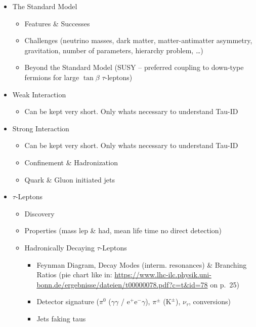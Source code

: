 \begin{itemize}

\item The Standard Model
  \begin{itemize}
  \item Features \& Successes

  \item Challenges (neutrino masses, dark matter, matter-antimatter asymmetry,
    gravitation, number of parameters, hierarchy problem, \ldots)

  \item Beyond the Standard Model (SUSY -- preferred coupling to down-type
    fermions for large $\tan\beta$ \textrightarrow $\tau$-leptons)
  \end{itemize}

\item Weak Interaction
\begin{itemize}
\item Can be kept very short. Only whats necessary to understand Tau-ID
\end{itemize}

\item Strong Interaction
\begin{itemize}
\item Can be kept very short. Only whats necessary to understand Tau-ID
\item Confinement \& Hadronization
\item Quark \& Gluon initiated jets
\end{itemize}

\item $\tau$-Leptons
\begin{itemize}
\item Discovery

\item Properties (mass \textrightarrow lep \& had, mean life time
  \textrightarrow no direct detection)

\item Hadronically Decaying $\tau$-Leptons
  \begin{itemize}
  \item Feynman Diagram, Decay Modes (interm. resonances) \& Branching Ratios
    (pie chart like in: \url{https://www.lhc-ilc.physik.uni-bonn.de/ergebnisse/dateien/t00000078.pdf?c=t&id=78}
    on p.\ 25)
  \item Detector signature ($\pi^0$ ($\gamma \gamma$ / $\mathrm{e}^+
    \mathrm{e}^- \gamma$), $\pi^\pm$ ($\mathrm{K}^\pm$), $\nu_\tau$,
    conversions)
  \item Jets faking taus
  \end{itemize}


\end{itemize}
\end{itemize}
